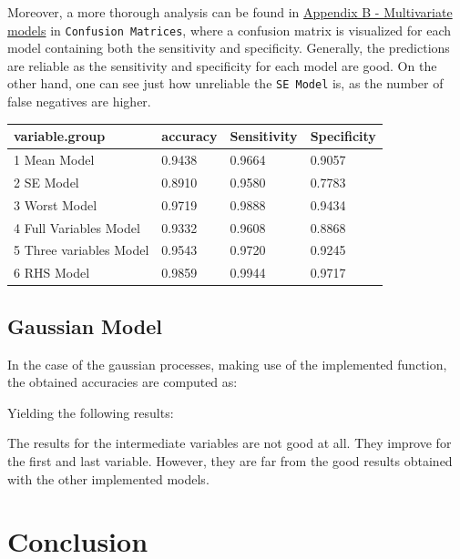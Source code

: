 \documentclass[
]{article}
\begin{document}
Moreover, a more thorough analysis can be found in
\protect\hyperlink{apb}{Appendix B - Multivariate models} in
\texttt{Confusion\ Matrices}, where a confusion matrix is visualized for
each model containing both the sensitivity and specificity. Generally,
the predictions are reliable as the sensitivity and specificity for each
model are good. On the other hand, one can see just how unreliable the
\texttt{SE\ Model} is, as the number of false negatives are higher.

\begin{table}[H]
\centering
\begin{tabular}{|l|l|l|l|}
\hline
\textbf{variable.group} & \textbf{accuracy} & Sensitivity & Specificity \\ \hline
1 Mean Model            & 0.9438     & 0.9664 & 0.9057       \\ \hline
2 SE Model              & 0.8910 & 0.9580 & 0.7783             \\ \hline
3 Worst Model           & 0.9719 & 0.9888 & 0.9434           \\ \hline
4 Full Variables Model  & 0.9332 & 0.9608 & 0.8868            \\ \hline
5 Three variables Model & 0.9543 & 0.9720 & 0.9245            \\ \hline
6 RHS Model             & 0.9859 & 0.9944 & 0.9717           \\ \hline
\end{tabular}
\end{table}

\hypertarget{gaussian-model-4}{%
\subsection{Gaussian Model}\label{gaussian-model-4}}

In the case of the gaussian processes, making use of the implemented
function, the obtained accuracies are computed as:

Yielding the following results:

The results for the intermediate variables are not good at all. They
improve for the first and last variable. However, they are far from the
good results obtained with the other implemented models.

\hypertarget{conclusion}{%
\section{Conclusion}\label{conclusion}}
\end{document}
